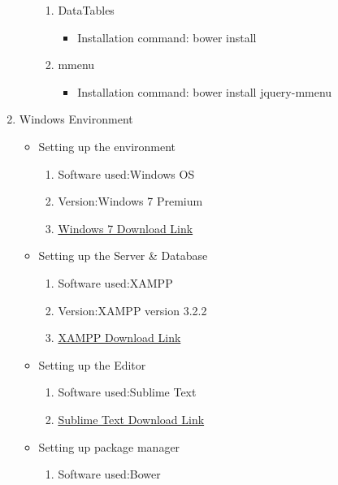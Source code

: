 \documentclass[a4paper,12pt,oneside]{book}
\begin{document}
\begin{enumerate}
\begin{itemize}
\begin{enumerate}
                \item{DataTables}
                    \begin{itemize}
                        \item{Installation command: bower install }
                    \end{itemize}
                \item{mmenu}
                    \begin{itemize}
                        \item{Installation command: bower install jquery-mmenu}
                    \end{itemize}
            \end{enumerate}
    \end{itemize}
    \item Windows Environment
    \begin{itemize}
        \item Setting up the environment
            \begin{enumerate}
            \item Software used:Windows OS
            \item Version:Windows 7 Premium
            \item \href{https://www.microsoft.com/en-in/software-download/windows7}{Windows 7 Download Link}
        \end{enumerate}
        \item Setting up the Server \& Database
            \begin{enumerate}
                \item Software used:XAMPP
                \item Version:XAMPP version 3.2.2
                \item \href{https://www.apachefriends.org/download.html}{XAMPP Download Link}
            \end{enumerate}
        \item Setting up the Editor
            \begin{enumerate}
                \item Software used:Sublime Text
                \item \href{https://www.sublimetext.com/}{Sublime Text Download Link}
            \end{enumerate}
        \item{Setting up package manager}
            \begin{enumerate}
                \item{Software used:Bower}

\end{enumerate}
\end{itemize}
\end{enumerate}
\end{document}
